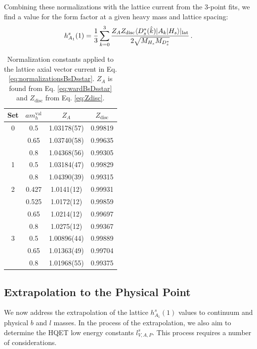 Combining these normalizations with the lattice current from the 3-point fits, we find a value for the form factor at a given heavy mass and lattice spacing:
\begin{align}
  h_{A_1}^s(1) = {1\over 3} \sum_{k=0}^3 { Z_A Z_{\text{disc}}\langle D_s^*(\hat{k}) | A_k | H_s \rangle |_{\text{lat}}\over 2\sqrt{M_{H_s} M_{D_s^*}} }\,.
  \label{eq:normalizationsBsDsstar}
\end{align}

\begin{table}
\begin{center}
\begin{tabular}{ c c c c }
\hline
Set & $am_h^{\text{val}}$ & $Z_A$& $Z_{\text{disc}}$\\ [0.5ex]
\hline
0 & 0.5 & 1.03178(57) & 0.99819\\ [0.5ex] 
 & 0.65 & 1.03740(58) & 0.99635\\ [0.5ex] 
 & 0.8 & 1.04368(56) & 0.99305\\ [0.5ex] 
\hline
1 & 0.5 & 1.03184(47) & 0.99829\\ [0.5ex] 
 & 0.8 & 1.04390(39) & 0.99315\\ [0.5ex] 
\hline
2 & 0.427 & 1.0141(12) & 0.99931\\ [0.5ex] 
 & 0.525 & 1.0172(12) & 0.99859\\ [0.5ex] 
 & 0.65 & 1.0214(12) & 0.99697\\ [0.5ex] 
 & 0.8 & 1.0275(12) & 0.99367\\ [0.5ex] 
\hline
3 & 0.5 & 1.00896(44) & 0.99889\\ [0.5ex] 
 & 0.65 & 1.01363(49) & 0.99704\\ [0.5ex] 
 & 0.8 & 1.01968(55) & 0.99375\\ [0.5ex] 
\hline
\end{tabular}
\caption{Normalization constants applied to the lattice axial vector current in Eq. \eqref{eq:normalizationsBsDsstar}. $Z_A$ is found from Eq. \eqref{eq:wardBsDsstar} and $Z_{\text{disc}}$ from Eq. \eqref{eq:Zdisc}. \label{tab:norms}}
\end{center}
\end{table}


\subsection{Extrapolation to the Physical Point}
\label{sec:BsDsstar_extrapolation}

We now address the extrapolation of the lattice $h_{A_1}^s(1)$ values to continuum and physical $b$ and $l$ masses. In the process of the extrapolation, we also aim to determine the HQET low energy constants $l^s_{V,A,P}$. This process requires a number of considerations.

